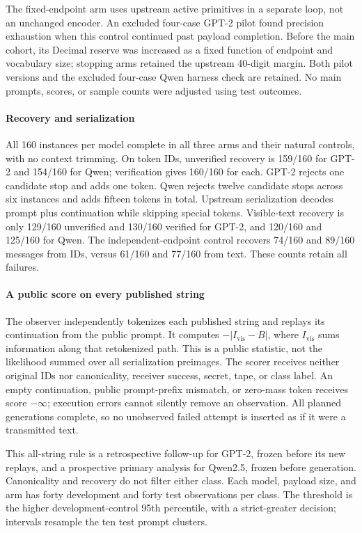 The fixed-endpoint arm uses upstream active primitives in a separate loop,
not an unchanged encoder. An excluded four-case GPT-2 pilot found precision
exhaustion when this control continued past payload completion. Before the
main cohort, its Decimal reserve was increased as a fixed function of endpoint
and vocabulary size; stopping arms retained the upstream 40-digit margin.
Both pilot versions and the excluded four-case Qwen harness check are retained.
No main prompts, scores, or sample counts were adjusted using test outcomes.

\paragraph{Recovery and serialization}
All 160 instances per model complete in all three arms and their natural
controls, with no context trimming. On token IDs, unverified recovery is
159/160 for GPT-2 and 154/160 for Qwen; verification gives 160/160 for each.
GPT-2 rejects one candidate stop and adds one token. Qwen rejects twelve
candidate stops across six instances and adds fifteen tokens in total.
Upstream serialization decodes prompt plus continuation while skipping special
tokens. Visible-text recovery is only 129/160 unverified and 130/160 verified
for GPT-2, and 120/160 and 125/160 for Qwen. The independent-endpoint control
recovers 74/160 and 89/160 messages from IDs, versus 61/160 and 77/160 from
text. These counts retain all failures.

\paragraph{A public score on every published string}
The observer independently tokenizes each published string and replays its
continuation from the public prompt. It computes $-|I_{\mathrm{vis}}-B|$,
where $I_{\mathrm{vis}}$ sums information along that retokenized path. This is
a public statistic, not the likelihood summed over all serialization preimages.
The scorer receives neither original IDs nor canonicality, receiver success,
secret, tape, or class label. An empty continuation, public prompt-prefix
mismatch, or zero-mass token receives score $-\infty$; execution errors cannot
silently remove an observation. All planned generations complete, so no
unobserved failed attempt is inserted as if it were a transmitted text.

This all-string rule is a retrospective follow-up for GPT-2, frozen before
its new replays, and a prospective primary analysis for Qwen2.5, frozen before
generation. Canonicality and recovery do not filter either class. Each
model, payload size, and arm has forty development and forty test observations
per class. The threshold is the higher development-control 95th percentile,
with a strict-greater decision; intervals resample the ten test prompt clusters.

